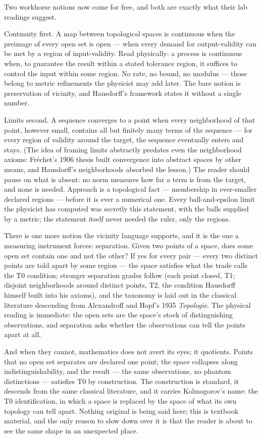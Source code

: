 Two workhorse notions now come for free, and both are exactly what their lab
readings suggest.

Continuity first. A map between topological spaces is continuous when the
preimage of every open set is open --- when every demand for output-validity
can be met by a region of input-validity. Read physically: a process is
continuous when, to guarantee the result within a stated tolerance region, it
suffices to control the input within some region. No rate, no bound, no
modulus --- those belong to metric refinements the physicist may add later.
The bare notion is preservation of vicinity, and Hausdorff's framework states
it without a single number.

Limits second. A sequence converges to a point when every neighborhood of that
point, however small, contains all but finitely many terms of the sequence ---
for every region of validity around the target, the sequence eventually enters
and stays. (The idea of framing limits abstractly predates even the
neighborhood axioms: Fr\'echet's 1906 thesis built convergence into abstract
spaces by other means, and Hausdorff's neighborhoods absorbed the lesson.)
The reader should pause on what is absent: no norm measures how far a term is
from the target, and none is needed. Approach is a topological fact ---
membership in ever-smaller declared regions --- before it is ever a numerical
one. Every ball-and-epsilon limit the physicist has computed was secretly this
statement, with the balls supplied by a metric; the statement itself never
needed the ruler, only the regions.

There is one more notion the vicinity language supports, and it is the one a
measuring instrument forces: separation. Given two points of a space, does
some open set contain one and not the other? If yes for every pair --- every
two distinct points are told apart by some region --- the space satisfies what
the trade calls the T0 condition; stronger separation grades follow (each
point closed, T1; disjoint neighborhoods around distinct points, T2, the
condition Hausdorff himself built into his axioms), and the taxonomy is laid
out in the classical literature descending from Alexandroff and Hopf's 1935
\emph{Topologie}. The physical reading is immediate: the open sets are the
space's stock of distinguishing observations, and separation asks whether the
observations can tell the points apart at all.

And when they cannot, mathematics does not avert its eyes; it quotients. Points
that no open set separates are declared one point; the space collapses along
indistinguishability, and the result --- the same observations, no phantom
distinctions --- satisfies T0 by construction. The construction is standard,
it descends from the same classical literature, and it carries Kolmogorov's
name: the T0 identification, in which a space is replaced by the space of
what its own topology can tell apart. Nothing original is being said here;
this is textbook material, and the only reason to slow down over it is that
the reader is about to see the same shape in an unexpected place.

